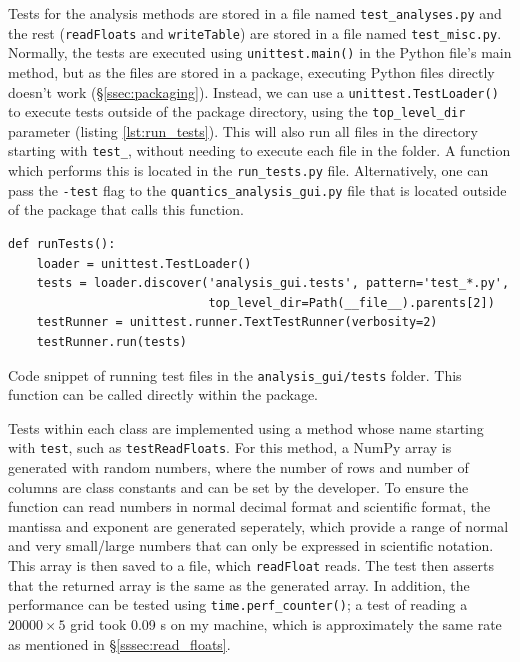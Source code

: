 \documentclass[12pt]{article}
\newenvironment{code}{\captionsetup{type=listing}}{\par\addvspace{\baselineskip}}
\begin{document}
Tests for the analysis methods are stored in a file named \texttt{test\_analyses.py} and the rest (\texttt{readFloats} and \texttt{writeTable}) are stored in a file named \texttt{test\_misc.py}. Normally, the tests are executed using \texttt{unittest.main()} in the Python file's main method, but as the files are stored in a package, executing Python files directly doesn't work (\S\ref{ssec:packaging}). Instead, we can use a \texttt{unittest.TestLoader()} to execute tests outside of the package directory, using the \texttt{top\_level\_dir} parameter (listing \ref{lst:run_tests}). This will also run all files in the directory starting with \texttt{test\_}, without needing to execute each file in the folder. A function which performs this is located in the \texttt{run\_tests.py} file. Alternatively, one can pass the \texttt{-test} flag to the \texttt{quantics\_analysis\_gui.py} file that is located outside of the package that calls this function.

\begin{code}\begin{verbatim}
def runTests():
    loader = unittest.TestLoader()
    tests = loader.discover('analysis_gui.tests', pattern='test_*.py',
                            top_level_dir=Path(__file__).parents[2])
    testRunner = unittest.runner.TextTestRunner(verbosity=2)
    testRunner.run(tests)
\end{verbatim}
\caption{Code snippet of running test files in the \texttt{analysis\_gui/tests} folder. This function can be called directly within the package.}
\label{lst:run_tests}
\end{code}

Tests within each class are implemented using a method whose name starting with \texttt{test}, such as \texttt{testReadFloats}. For this method, a NumPy array is generated with random numbers, where the number of rows and number of columns are class constants and can be set by the developer. To ensure the function can read numbers in normal decimal format and scientific format, the mantissa and exponent are generated seperately, which provide a range of normal and very small/large numbers that can only be expressed in scientific notation. This array is then saved to a file, which \texttt{readFloat} reads. The test then asserts that the returned array is the same as the generated array. In addition, the performance can be tested using \texttt{time.perf\_counter()}; a test of reading a \(20000\times 5\) grid took 0.09 s on my machine, which is approximately the same rate as mentioned in \S\ref{sssec:read_floats}.
\end{document}
